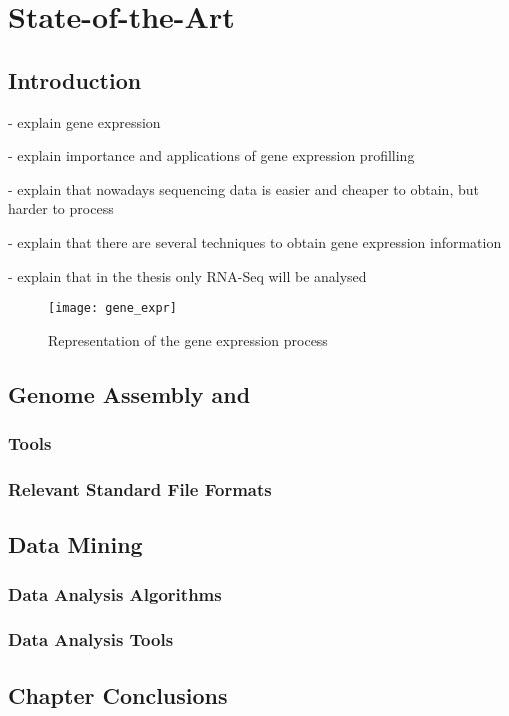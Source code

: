 \chapter{State-of-the-Art} \label{chap:sota}

\section*{}

\section{Introduction}

- explain gene expression

- explain importance and applications of gene expression profilling

- explain that nowadays sequencing data is easier and cheaper to obtain, but
  harder to process

- explain that there are several techniques to obtain gene expression
  information

- explain that in the thesis only RNA-Seq will be analysed

\begin{figure}[!htb]
  \begin{center}
    \leavevmode
    \texttt{[image: gene\_expr]}
    \caption{Representation of the gene expression process\protect\footnotemark}
    \label{fig:arch}
  \end{center}
\end{figure}

\section{Genome Assembly and \rnaseq}\label{sec:assembly}

\subsection{\rnaseq{} Tools}\label{sec:seqtools}

\subsection{Relevant Standard File Formats}\label{sec:formats}

\section{Data Mining}\label{sec:mlearning}

\subsection{Data Analysis Algorithms}\label{sec:minalgo}

\subsection{Data Analysis Tools}\label{sec:mintools}

\section{Chapter Conclusions}
